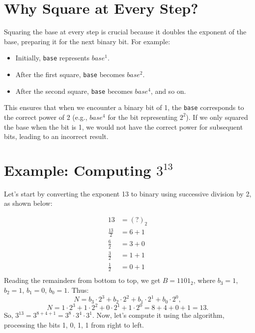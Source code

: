 \documentclass{article}
\begin{document}
    \section{Why Square at Every Step?}
    Squaring the base at every step is crucial because it doubles the exponent of the base, preparing it for the next binary bit. For example:
    \begin{itemize}
        \item Initially, \texttt{base} represents \(base^1\).
        \item After the first square, \texttt{base} becomes \(base^2\).
        \item After the second square, \texttt{base} becomes \(base^4\), and so on.
    \end{itemize}
    This ensures that when we encounter a binary bit of 1, the \texttt{base} corresponds to the correct power of 2 (e.g., \(base^4\) for the bit representing \(2^2\)). If we only squared the base when the bit is 1, we would not have the correct power for subsequent bits, leading to an incorrect result.

    \section{Example: Computing \(3^{13}\)}
    Let’s start by converting the exponent 13 to binary using successive division by 2, as shown below:

    \begin{align*}
        13 &= (?)_2 \\
        \frac{13}{2} &= 6 + 1 \\
        \frac{6}{2} &= 3 + 0 \\
        \frac{3}{2} &= 1 + 1 \\
        \frac{1}{2} &= 0 + 1 \\
    \end{align*}
    Reading the remainders from bottom to top, we get \(B = 1101_2\), where \(b_3 = 1\), \(b_2 = 1\), \(b_1 = 0\), \(b_0 = 1\). Thus:
    \[
        N = b_3 \cdot 2^3 + b_2 \cdot 2^2 + b_1 \cdot 2^1 + b_0 \cdot 2^0,
    \]
    \[
        N = 1 \cdot 2^3 + 1 \cdot 2^2 + 0 \cdot 2^1 + 1 \cdot 2^0 = 8 + 4 + 0 + 1 = 13.
    \]
    So, \(3^{13} = 3^{8 + 4 + 1} = 3^8 \cdot 3^4 \cdot 3^1\). Now, let’s compute it using the algorithm, processing the bits 1, 0, 1, 1 from right to left.
\end{document}
